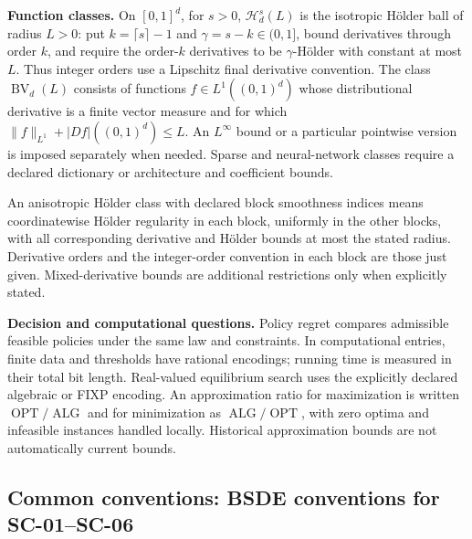 \documentclass[11pt,a4paper]{article}
\begin{document}
\textbf{Function classes.}
On $[0,1]^d$, for $s>0$, $\mathcal H_d^s(L)$ is the isotropic Hölder ball of radius
$L>0$: put $k=\lceil s\rceil-1$ and $\gamma=s-k\in(0,1]$, bound derivatives
through order $k$, and require the order-$k$ derivatives to be
$\gamma$-Hölder with constant at most $L$. Thus integer orders use a
Lipschitz final derivative convention. The class
$\operatorname{BV}_d(L)$ consists of functions $f\in L^1((0,1)^d)$ whose
distributional derivative is a finite vector measure and for which
$\|f\|_{L^1}+|Df|((0,1)^d)\leq L$.
An $L^\infty$ bound or a particular pointwise version is imposed separately
when needed. Sparse and neural-network classes require a declared
dictionary or architecture and coefficient bounds.

An anisotropic H\"older class with declared block smoothness indices means
coordinatewise H\"older regularity in each block, uniformly in the other
blocks, with all corresponding derivative and H\"older bounds at most
the stated radius. Derivative orders and the integer-order convention in
each block are those just given. Mixed-derivative bounds are additional
restrictions only when explicitly stated.

\textbf{Decision and computational questions.}
Policy regret compares admissible feasible policies under the same law and
constraints. In computational entries, finite data and thresholds have
rational encodings; running time is measured in their total bit length.
Real-valued equilibrium search uses the explicitly declared algebraic or
FIXP encoding. An approximation ratio for maximization is written
$\operatorname{OPT}/\operatorname{ALG}$ and for minimization as
$\operatorname{ALG}/\operatorname{OPT}$, with zero optima and infeasible
instances handled locally. Historical approximation bounds are not
automatically current bounds.

\subsection*{Common conventions: BSDE conventions for SC-01--SC-06}
\end{document}
